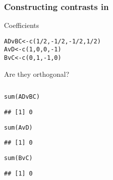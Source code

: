 \documentclass[color=usenames,dvipsnames]{beamer}\usepackage[]{graphicx}\usepackage[]{color}
\makeatletter
\newcommand{\hlnum}[1]{\textcolor[rgb]{0.69,0.494,0}{#1}}%
\newcommand{\hlopt}[1]{\textcolor[rgb]{0,0,0}{#1}}%
\newcommand{\hlstd}[1]{\textcolor[rgb]{0,0,0}{#1}}%
\newcommand{\hlkwb}[1]{\textcolor[rgb]{0,0.341,0.682}{#1}}%
\newcommand{\hlkwd}[1]{\textcolor[rgb]{0.004,0.004,0.506}{#1}}%
\newenvironment{kframe}{%
 \def\at@end@of@kframe{}%
 \ifinner\ifhmode%
  \def\at@end@of@kframe{\end{minipage}}%
  \begin{minipage}{\columnwidth}%
 \fi\fi%
 \def\FrameCommand##1{\hskip\@totalleftmargin \hskip-\fboxsep
 \colorbox{shadecolor}{##1}\hskip-\fboxsep
     \hskip-\linewidth \hskip-\@totalleftmargin \hskip\columnwidth}%
 \MakeFramed {\advance\hsize-\width
   \@totalleftmargin\z@ \linewidth\hsize
   \@setminipage}}%
 {\par\unskip\endMakeFramed%
 \at@end@of@kframe}
\newenvironment{knitrout}{}{} %
\makeatother
\begin{document}
\begin{frame}[fragile]
  \frametitle{Constructing contrasts in \R}
  \small
  {%
    Coefficients}
\begin{knitrout}\scriptsize
{}\color{fgcolor}\begin{kframe}
\begin{alltt}
\hlstd{ADvBC} \hlkwb{<-} \hlkwd{c}\hlstd{(}\hlnum{1}\hlopt{/}\hlnum{2}\hlstd{,} \hlopt{-}\hlnum{1}\hlopt{/}\hlnum{2}\hlstd{,} \hlopt{-}\hlnum{1}\hlopt{/}\hlnum{2}\hlstd{,} \hlnum{1}\hlopt{/}\hlnum{2}\hlstd{)}
\hlstd{AvD} \hlkwb{<-} \hlkwd{c}\hlstd{(}\hlnum{1}\hlstd{,} \hlnum{0}\hlstd{,} \hlnum{0}\hlstd{,} \hlopt{-}\hlnum{1}\hlstd{)}
\hlstd{BvC} \hlkwb{<-} \hlkwd{c}\hlstd{(}\hlnum{0}\hlstd{,} \hlnum{1}\hlstd{,} \hlopt{-}\hlnum{1}\hlstd{,} \hlnum{0}\hlstd{)}
\end{alltt}
\end{kframe}
\end{knitrout}
\pause
{%
Are they orthogonal?}
\pause
\begin{columns}
  \begin{column}{0.5\textwidth}
\begin{knitrout}\scriptsize
{}\color{fgcolor}\begin{kframe}
\begin{alltt}
\hlkwd{sum}\hlstd{(ADvBC)}
\end{alltt}
\begin{verbatim}
## [1] 0
\end{verbatim}
\begin{alltt}
\hlkwd{sum}\hlstd{(AvD)}
\end{alltt}
\begin{verbatim}
## [1] 0
\end{verbatim}
\begin{alltt}
\hlkwd{sum}\hlstd{(BvC)}
\end{alltt}
\begin{verbatim}
## [1] 0
\end{verbatim}
\end{kframe}
\end{knitrout}
  \end{column}
  \pause
  \begin{column}{0.5\textwidth}
\begin{knitrout}\scriptsize
{}\color{fgcolor}\begin{kframe}
\begin{alltt}

\end{alltt}
\end{kframe}
\end{knitrout}
\end{column}
\end{columns}
\end{frame}
\end{document}
